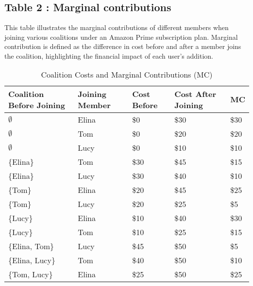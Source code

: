 \documentclass[12pt]{article}
\begin{document}
\subsection{Table 2 : Marginal contributions}
This table illustrates the marginal contributions of different members when joining various coalitions under an Amazon Prime subscription plan. Marginal contribution is defined as the difference in cost before and after a member joins the coalition, highlighting the financial impact of each user's addition. 
\begin{table}[H]
	\centering
	\caption{Coalition Costs and Marginal Contributions (MC)}
	\begin{tabular}{lllll}
		\toprule
		Coalition Before Joining & Joining Member & Cost Before & Cost After Joining & MC \\
		\midrule
		$\emptyset$ & Elina & \$0 & \$30 & \$30 \\
		$\emptyset$ & Tom & \$0 & \$20 & \$20 \\
		$\emptyset$ & Lucy & \$0 & \$10 & \$10 \\
		\{Elina\} & Tom & \$30 & \$45 & \$15 \\
		\{Elina\} & Lucy & \$30 & \$40 & \$10 \\
		\{Tom\} & Elina & \$20 & \$45 & \$25 \\
		\{Tom\} & Lucy & \$20 & \$25 & \$5 \\
		\{Lucy\} & Elina & \$10 & \$40 & \$30 \\
		\{Lucy\} & Tom & \$10 & \$25 & \$15 \\
		\{Elina, Tom\} & Lucy & \$45 & \$50 & \$5 \\
		\{Elina, Lucy\} & Tom & \$40 & \$50 & \$10 \\
		\{Tom, Lucy\} & Elina & \$25 & \$50 & \$25 \\
		\bottomrule
	\end{tabular}%
	\label{tab:coalition_costs}%
\end{table}%
\end{document}
